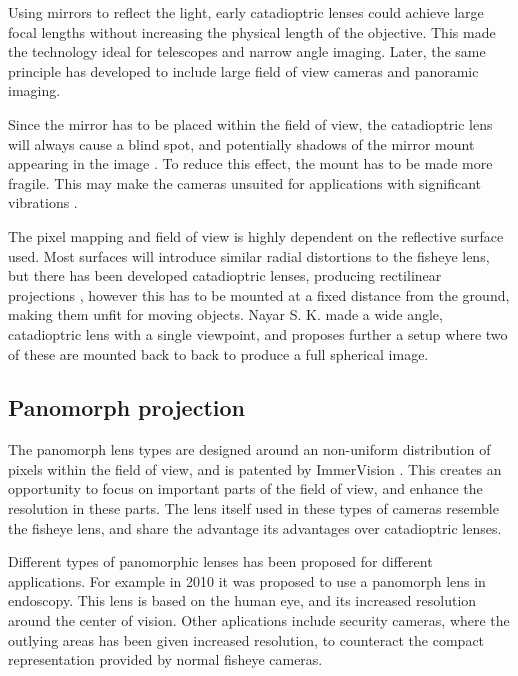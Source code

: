 Using mirrors to reflect the light, early catadioptric lenses could achieve large focal lengths without increasing the physical length of the objective. This made the technology ideal for telescopes and narrow angle imaging. Later, the same principle has developed to include large field of view cameras and panoramic imaging. 

Since the mirror has to be placed within the field of view, the catadioptric lens will always cause a blind spot, and potentially shadows of the mirror mount appearing in the image . To reduce this effect, the mount has to be made more fragile. This may make the cameras unsuited for applications with significant vibrations .

The pixel mapping and field of view is highly dependent on the reflective surface used. Most surfaces will introduce similar radial distortions to the fisheye lens, but there has been developed catadioptric lenses, producing rectilinear projections , however this has to be mounted at a fixed distance from the ground, making them unfit for moving objects. Nayar S. K. made a wide angle, catadioptric lens  with a single viewpoint, and proposes further a setup where two of these are mounted back to back to produce a full spherical image. 


\subsection{Panomorph projection}

The panomorph lens types are designed around an non-uniform distribution of pixels within the field of view, and is patented by ImmerVision . This creates an opportunity to focus on important parts of the field of view, and enhance the resolution in these parts. The lens itself used in these types of cameras resemble the fisheye lens, and share the advantage its advantages over catadioptric lenses. 

Different types of panomorphic lenses has been proposed for different applications. For example in 2010 it was proposed to use a panomorph lens in endoscopy\cite{endoscopypano}. This lens is based on the human eye, and its increased resolution around the center of vision. Other aplications include security cameras, where the outlying areas has been given increased resolution, to counteract the compact representation provided by normal fisheye cameras.

